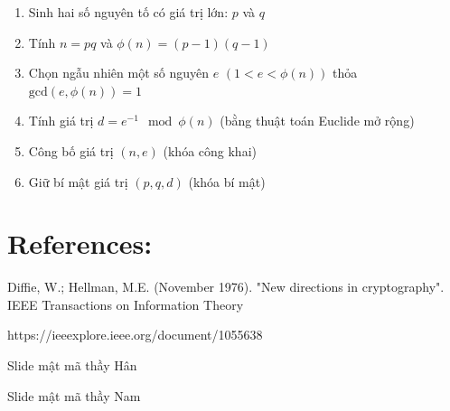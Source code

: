 \documentclass{article}
\begin{document}
\begin{enumerate}
    \item Sinh hai số nguyên tố có giá trị lớn: $p$ và $q$
    \item Tính $n = pq$ và $\phi(n) = (p - 1)(q - 1)$
    \item Chọn ngẫu nhiên một số nguyên $e$ $(1 < e < \phi(n))$ thỏa $\text{gcd}(e, \phi(n)) = 1$
    \item Tính giá trị $d = e^{-1} \mod \phi(n)$ (bằng thuật toán Euclide mở rộng)
    \item Công bố giá trị $(n, e)$ (khóa công khai)
    \item Giữ bí mật giá trị $(p, q, d)$ (khóa bí mật)
\end{enumerate}


 




\section*{References:}
Diffie, W.; Hellman, M.E. (November 1976). "New directions in cryptography". IEEE Transactions on Information Theory


https://ieeexplore.ieee.org/document/1055638





Slide mật mã thầy Hân

Slide mật mã thầy Nam
\end{document}
